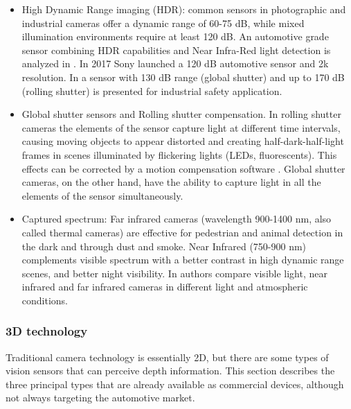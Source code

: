 \begin{itemize}    
    \item High Dynamic Range imaging (HDR): common sensors in photographic and 
    industrial cameras offer a dynamic range of 60-75 dB, while
    mixed illumination environments require at least 120 dB.
    An automotive grade sensor combining HDR capabilities and Near Infra-Red
    light detection is analyzed in \cite{Maddalena2005}. In 2017 Sony launched
    a 120 dB automotive sensor and 2k resolution.
    In \cite{Strobel2013} a sensor with 130 dB range (global shutter) and up
    to 170 dB (rolling shutter) is presented for industrial safety application.
    
    \item Global shutter sensors and Rolling shutter compensation. In rolling
    shutter cameras the elements of the sensor capture light at different time 
    intervals, causing moving objects to appear distorted and creating
    half-dark-half-light frames in scenes illuminated by flickering lights
    (LEDs, fluorescents). 
    This effects can be corrected by a motion compensation software 
    \cite{Chia-KaiLiang2008}\cite{Chun2008}. Global shutter cameras, on the
    other hand, have the ability to capture light in all the elements of the 
    sensor simultaneously. 
        
    \item Captured spectrum: Far infrared cameras (wavelength 900-1400 nm, also
    called thermal cameras) are effective for pedestrian and animal detection
    \cite{OMalley2008}\cite{Besbes2015} in the dark and through dust and smoke.
    Near Infrared (750-900 nm) complements visible spectrum with a better
    contrast in high dynamic range scenes, and better night visibility. 
    In \cite{Pinchon2018} authors compare visible light, near infrared and far
    infrared cameras in different light and atmospheric conditions.
    
\end{itemize} 

\subsubsection{3D technology}
Traditional camera technology is essentially 2D, but there are some
types of vision sensors that can perceive depth information. This section
describes the three principal types that are already available as commercial
devices, although not always targeting the automotive market.

